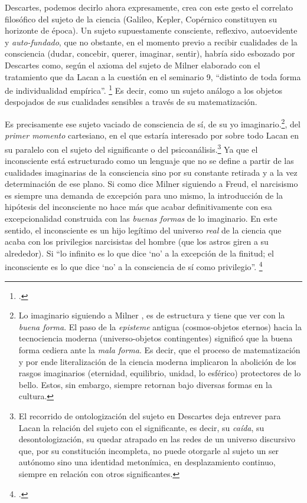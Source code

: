 Descartes, podemos decirlo ahora expresamente, crea con este gesto el correlato filosófico del sujeto de la ciencia (Galileo, Kepler, Copérnico constituyen su horizonte de época). Un sujeto supuestamente consciente, reflexivo, autoevidente y \emph{auto-fundado}, que no obstante, en el momento previo a recibir cualidades de la consciencia (dudar, concebir, querer, imaginar, sentir), habría sido esbozado por Descartes como, según el axioma del sujeto de Milner elaborado con el tratamiento que da Lacan a la cuestión en el seminario 9, \enquote{distinto de toda forma de individualidad empírica}. \footcite[][35]{@7128-MILNER1999} Es decir, como un sujeto análogo a los objetos despojados de sus cualidades sensibles a través de su matematización.

Es precisamente ese sujeto vaciado de consciencia de sí, de su yo imaginario.\footnote{Lo imaginario siguiendo a Milner \parencite[][58-59]{@7128-MILNER1999}, es de estructura y tiene que ver con la \emph{buena forma}. El paso de la \textit{episteme} antigua (cosmos-objetos eternos) hacia la tecnociencia moderna (universo-objetos contingentes) significó que la buena forma cediera ante la \emph{mala forma}. Es decir, que el proceso de matematización y por ende literalización de la ciencia moderna implicaron la abolición de los rasgos imaginarios (eternidad, equilibrio, unidad, lo esférico) protectores de lo bello. Estos, sin embargo, siempre retornan bajo diversas formas en la cultura.}, del \emph{primer momento} cartesiano, en el que estaría interesado por sobre todo Lacan en su paralelo con el sujeto del significante o del psicoanálisis.\footnote{El recorrido de ontologización del sujeto en Descartes deja entrever para Lacan la relación del sujeto con el significante, es decir, su \emph{caída}, su desontologización, su quedar atrapado en las redes de un universo discursivo que, por su constitución incompleta, no puede otorgarle al sujeto un ser autónomo sino una identidad metonímica, en desplazamiento continuo, siempre en relación con otros significantes.} Ya que el inconsciente está estructurado como un lenguaje que no se define a partir de las cualidades imaginarias de la consciencia sino por su constante retirada y a la vez determinación de ese plano. Si como dice Milner siguiendo a Freud, el narcisismo es siempre una demanda de excepción para uno mismo, la introducción de la hipótesis del inconsciente no hace más que acabar definitivamente con esa excepcionalidad construida con las \emph{buenas formas} de lo imaginario. En este sentido, el inconsciente es un hijo legítimo del universo \emph{real} de la ciencia que acaba con los privilegios narcisistas del hombre (que los astros giren a su alrededor). Si \enquote{lo infinito es lo que dice \enquote{no} a la excepción de la finitud; el inconsciente es lo que dice \enquote{no} a la consciencia de sí como privilegio}. \footcite[][69]{@7128-MILNER1999}

